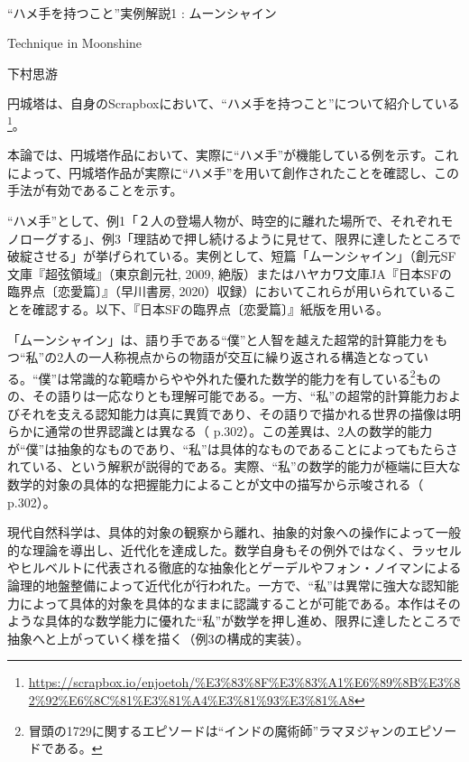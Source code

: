 \documentclass[10pt, a5paper, twoside]{jsarticle}
\theoremstyle{definition}
\begin{document}
	~ %

	\begin{center}

		\Large{“ハメ手を持つこと”実例解説1 : ムーンシャイン}

		\vspace{3mm}

		\large{Technique in Moonshine}

		\vspace{3mm}
		
		\large{下村思游}

	\end{center}

	\vspace{3mm}

		円城塔は、自身のScrapboxにおいて、“ハメ手を持つこと”について紹介している\footnote{\url{https://scrapbox.io/enjoetoh/%E3%83%8F%E3%83%A1%E6%89%8B%E3%82%92%E6%8C%81%E3%81%A4%E3%81%93%E3%81%A8}}。

		本論では、円城塔作品において、実際に“ハメ手”が機能している例を示す。これによって、円城塔作品が実際に“ハメ手”を用いて創作されたことを確認し、この手法が有効であることを示す。

		“ハメ手”として、例1「２人の登場人物が、時空的に離れた場所で、それぞれモノローグする」、例3「理詰めで押し続けるように見せて、限界に達したところで破綻させる」が挙げられている。実例として、短篇「ムーンシャイン」（創元SF文庫『超弦領域』（東京創元社, 2009, 絶版）またはハヤカワ文庫JA『日本SFの臨界点〔恋愛篇〕』（早川書房, 2020）収録）においてこれらが用いられていることを確認する。以下、『日本SFの臨界点〔恋愛篇〕』紙版を用いる。

		「ムーンシャイン」は、語り手である“僕”と人智を越えた超常的計算能力をもつ“私”の2人の一人称視点からの物語が交互に繰り返される構造となっている。“僕”は常識的な範疇からやや外れた優れた数学的能力を有している\footnote{冒頭の1729に関するエピソードは“インドの魔術師”ラマヌジャンのエピソードである。}ものの、その語りは一応なりとも理解可能である。一方、“私”の超常的計算能力およびそれを支える認知能力は真に異質であり、その語りで描かれる世界の描像は明らかに通常の世界認識とは異なる（\cite{moon} p.302）。この差異は、2人の数学的能力が“僕”は抽象的なものであり、“私”は具体的なものであることによってもたらされている、という解釈が説得的である。実際、“私”の数学的能力が極端に巨大な数学的対象の具体的な把握能力によることが文中の描写から示唆される（\cite{moon} p.302）。

		現代自然科学は、具体的対象の観察から離れ、抽象的対象への操作によって一般的な理論を導出し、近代化を達成した。数学自身もその例外ではなく、ラッセルやヒルベルトに代表される徹底的な抽象化とゲーデルやフォン・ノイマンによる論理的地盤整備によって近代化が行われた。一方で、“私”は異常に強大な認知能力によって具体的対象を具体的なままに認識することが可能である。本作はそのような具体的な数学能力に優れた“私”が数学を押し進め、限界に達したところで抽象へと上がっていく様を描く（例3の構成的実装）。
\end{document}
